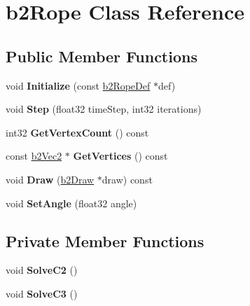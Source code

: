 \hypertarget{classb2Rope}{}\section{b2\+Rope Class Reference}
\label{classb2Rope}
\subsection*{Public Member Functions}
\begin{DoxyCompactItemize}
\item 
\mbox{\label{classb2Rope_a2a672ca3310790f4af1beb123e597d70}} 
void {\bfseries Initialize} (const \mbox{\hyperlink{structb2RopeDef}{b2\+Rope\+Def}} $\ast$def)
\item 
\mbox{\label{classb2Rope_abe9ce398cef717b136645cbc37f38d70}} 
void {\bfseries Step} (float32 time\+Step, int32 iterations)
\item 
\mbox{\label{classb2Rope_afdf6f7234dbf73fa83a058452e3d492a}} 
int32 {\bfseries Get\+Vertex\+Count} () const
\item 
\mbox{\label{classb2Rope_acf2b433c741b90b3668ff4477b4a8319}} 
const \mbox{\hyperlink{structb2Vec2}{b2\+Vec2}} $\ast$ {\bfseries Get\+Vertices} () const
\item 
\mbox{\label{classb2Rope_a9545f16b4ed203890a290d58ba56255c}} 
void {\bfseries Draw} (\mbox{\hyperlink{classb2Draw}{b2\+Draw}} $\ast$draw) const
\item 
\mbox{\label{classb2Rope_a8a1717a5e0b2c54d56fe438c8cae43b7}} 
void {\bfseries Set\+Angle} (float32 angle)
\end{DoxyCompactItemize}
\subsection*{Private Member Functions}
\begin{DoxyCompactItemize}
\item 
\mbox{\label{classb2Rope_abb803e414e406151c8c22ef814519b2a}} 
void {\bfseries Solve\+C2} ()
\item 
\mbox{\label{classb2Rope_ae18c19e30583e72e90ffb01674ba01ad}} 
void {\bfseries Solve\+C3} ()
\end{DoxyCompactItemize}
